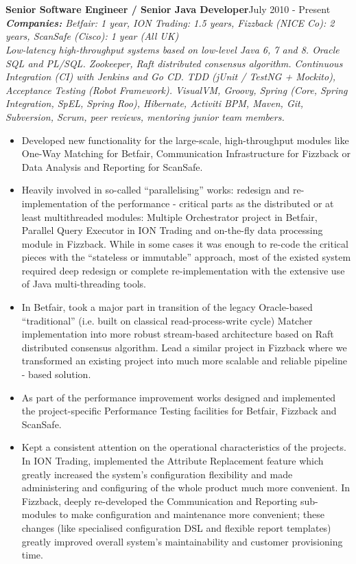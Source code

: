 \documentclass{res}
\newcommand{\aggjobdes}[4]{\needspace{3\baselineskip} %
{\noindent \bf #1\hspace{2ex}}{\hfill #2}\\
{{\noindent \small \textit{ \textbf{ Companies:} {\hfill #3}}}}\\{{\it \small #4.}}}
\newcommand{\osection}[1]{\section{\sc {\Large \textbf{#1}\\}} \vspace{0.30cm}}
\begin{document}
\begin{resume}
\begin{itemize}
\end{itemize}

\osection{Career History}
\aggjobdes {Senior Software Engineer / Senior Java Developer}{July 2010 - Present}
{Betfair: 1 year, ION Trading: 1.5 years, Fizzback (NICE Co): 2 years, ScanSafe (Cisco): 1 year (All UK)}
{Low-latency high-throughput systems based on low-level Java 6, 7 and 8. Oracle SQL and PL/SQL. Zookeeper, Raft distributed consensus algorithm. Continuous Integration (CI) with Jenkins and Go CD. TDD (jUnit / TestNG + Mockito), Acceptance Testing (Robot Framework). VisualVM, Groovy, Spring (Core, Spring Integration, SpEL, Spring Roo), Hibernate, Activiti BPM, Maven, Git, Subversion, Scrum, peer reviews, mentoring junior team members}
\begin{itemize}
 \item Developed new functionality for the large-scale, high-throughput modules like One-Way Matching for Betfair, Communication Infrastructure for Fizzback or Data Analysis and Reporting for ScanSafe.
 \item Heavily involved in so-called ``parallelising'' works: redesign and re-implementation of the performance - critical parts as the distributed or at least multithreaded modules: Multiple Orchestrator project in Betfair, Parallel Query Executor in ION Trading and on-the-fly data processing module in Fizzback. While in some cases it was enough to re-code the critical pieces with the “stateless or immutable” approach, most of the existed system required deep redesign or complete re-implementation with the extensive use of Java multi-threading tools.
 \item In Betfair, took a major part in transition of the legacy Oracle-based ``traditional'' (i.e. built on classical read-process-write cycle) Matcher implementation into more robust stream-based architecture based on Raft distributed consensus algorithm. Lead a similar project in Fizzback where we transformed an existing project into much more scalable and reliable pipeline - based solution.
 \item As part of the performance improvement works designed and implemented the project-specific Performance Testing facilities for Betfair, Fizzback and ScanSafe.
 \item Kept a consistent attention on the operational characteristics of the projects. In ION Trading, implemented the Attribute Replacement feature which greatly increased the system’s configuration flexibility and made administering and configuring of the whole product much more convenient. In Fizzback, deeply re-developed the Communication and Reporting sub-modules to make configuration and maintenance more convenient; these changes (like specialised configuration DSL and flexible report templates) greatly improved overall system's maintainability and customer provisioning time.

\end{itemize}
\end{resume}
\end{document}
